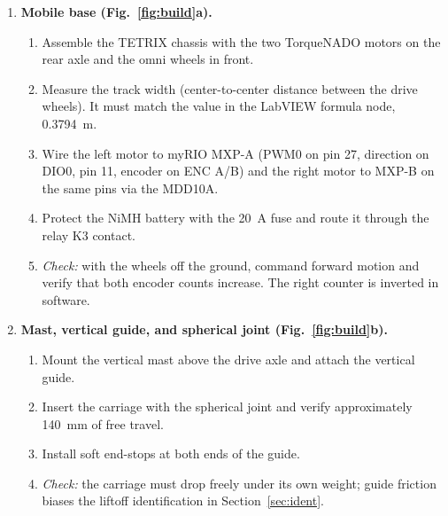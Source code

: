 \begin{enumerate}[label=\textbf{Step \arabic*.}, leftmargin=*, align=left]
  \item \textbf{Mobile base (Fig.~\ref{fig:build}a).}
  \begin{enumerate}[label=(\alph*)]
    \item Assemble the TETRIX chassis with the two TorqueNADO motors on the rear axle and the omni wheels in front.
    \item Measure the track width (center-to-center distance between the drive wheels). It must match the value in the LabVIEW formula node, \SI{0.3794}{\metre}.
    \item Wire the left motor to myRIO MXP-A (PWM0 on pin 27, direction on DIO0, pin 11, encoder on ENC A/B) and the right motor to MXP-B on the same pins via the MDD10A.
    \item Protect the NiMH battery with the \SI{20}{\ampere} fuse and route it through the relay K3 contact.
    \item \emph{Check:} with the wheels off the ground, command forward motion and verify that both encoder counts increase. The right counter is inverted in software.
  \end{enumerate}

  \item \textbf{Mast, vertical guide, and spherical joint (Fig.~\ref{fig:build}b).}
  \begin{enumerate}[label=(\alph*)]
    \item Mount the vertical mast above the drive axle and attach the vertical guide.
    \item Insert the carriage with the spherical joint and verify approximately \SI{140}{\milli\metre} of free travel.
    \item Install soft end-stops at both ends of the guide.
    \item \emph{Check:} the carriage must drop freely under its own weight; guide friction biases the liftoff identification in Section~\ref{sec:ident}.
  \end{enumerate}


\end{enumerate}
